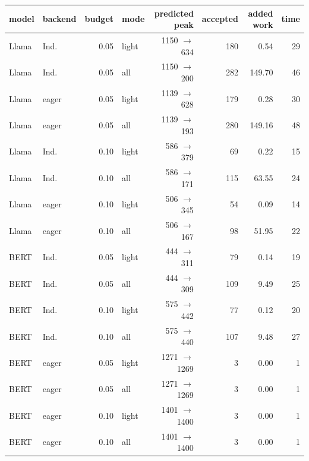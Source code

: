 \begin{tabular}{llrlrrrr}
\toprule
model & backend & budget & mode & predicted peak & accepted & added work & time \\
\midrule
Llama & Ind. & 0.05 & light & 1150 $\to$ 634 & 180 & 0.54 & 29 \\
Llama & Ind. & 0.05 & all & 1150 $\to$ 200 & 282 & 149.70 & 46 \\
Llama & eager & 0.05 & light & 1139 $\to$ 628 & 179 & 0.28 & 30 \\
Llama & eager & 0.05 & all & 1139 $\to$ 193 & 280 & 149.16 & 48 \\
Llama & Ind. & 0.10 & light & 586 $\to$ 379 & 69 & 0.22 & 15 \\
Llama & Ind. & 0.10 & all & 586 $\to$ 171 & 115 & 63.55 & 24 \\
Llama & eager & 0.10 & light & 506 $\to$ 345 & 54 & 0.09 & 14 \\
Llama & eager & 0.10 & all & 506 $\to$ 167 & 98 & 51.95 & 22 \\
BERT & Ind. & 0.05 & light & 444 $\to$ 311 & 79 & 0.14 & 19 \\
BERT & Ind. & 0.05 & all & 444 $\to$ 309 & 109 & 9.49 & 25 \\
BERT & Ind. & 0.10 & light & 575 $\to$ 442 & 77 & 0.12 & 20 \\
BERT & Ind. & 0.10 & all & 575 $\to$ 440 & 107 & 9.48 & 27 \\
BERT & eager & 0.05 & light & 1271 $\to$ 1269 & 3 & 0.00 & 1 \\
BERT & eager & 0.05 & all & 1271 $\to$ 1269 & 3 & 0.00 & 1 \\
BERT & eager & 0.10 & light & 1401 $\to$ 1400 & 3 & 0.00 & 1 \\
BERT & eager & 0.10 & all & 1401 $\to$ 1400 & 3 & 0.00 & 1 \\
\bottomrule
\end{tabular}
